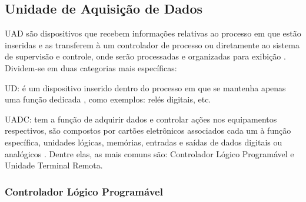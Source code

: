         \begin{figure}[!h]
	    \end{figure}
        
    \subsection{Unidade de Aquisição de Dados}
    \label{sec:uad}

        \gls{UAD} são dispositivos que recebem informações relativas ao processo em que estão inseridas e as transferem à um controlador de processo ou diretamente ao sistema de supervisão e controle, onde serão processadas e organizadas para exibição  \cite{mamede-instalacoes}.
        \newpage
        Dividem-se em duas categorias mais específicas:
        
        \begin{alineascomponto}
        	\item \gls{UD}: é um dispositivo inserido dentro do processo em que se mantenha apenas uma função dedicada  \cite{mamede-instalacoes}, como exemplos: relés digitais, etc.
        	\item \gls{UADC}: 
        	tem a função de adquirir dados e controlar ações nos equipamentos respectivos, são compostos por cartões eletrônicos associados cada um à função específica, unidades lógicas, memórias,  entradas e saídas de dados digitais ou analógicos \cite{mamede-instalacoes}. Dentre elas, as mais comuns são: Controlador Lógico Programável e Unidade Terminal Remota.
        \end{alineascomponto}

    \subsubsection{Controlador Lógico Programável}
    \label{sec:clp}

